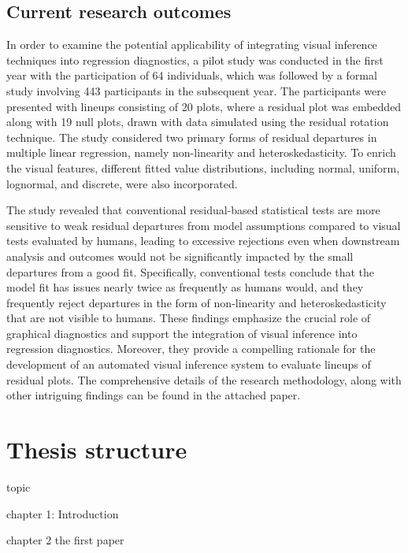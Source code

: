 \documentclass[11pt,a4paper,]{article}
\begin{document}
\hypertarget{current-research-outcomes}{%
\subsection{Current research outcomes}\label{current-research-outcomes}}

In order to examine the potential applicability of integrating visual inference techniques into regression diagnostics, a pilot study was conducted in the first year with the participation of 64 individuals, which was followed by a formal study involving 443 participants in the subsequent year. The participants were presented with lineups consisting of 20 plots, where a residual plot was embedded along with 19 null plots, drawn with data simulated using the residual rotation technique. The study considered two primary forms of residual departures in multiple linear regression, namely non-linearity and heteroskedasticity. To enrich the visual features, different fitted value distributions, including normal, uniform, lognormal, and discrete, were also incorporated.

The study revealed that conventional residual-based statistical tests are more sensitive to weak residual departures from model assumptions compared to visual tests evaluated by humans, leading to excessive rejections even when downstream analysis and outcomes would not be significantly impacted by the small departures from a good fit. Specifically, conventional tests conclude that the model fit has issues nearly twice as frequently as humans would, and they frequently reject departures in the form of non-linearity and heteroskedasticity that are not visible to humans. These findings emphasize the crucial role of graphical diagnostics and support the integration of visual inference into regression diagnostics. Moreover, they provide a compelling rationale for the development of an automated visual inference system to evaluate lineups of residual plots. The comprehensive details of the research methodology, along with other intriguing findings can be found in the attached paper.

\hypertarget{thesis-structure}{%
\section{Thesis structure}\label{thesis-structure}}

topic

chapter 1: Introduction

chapter 2
the first paper
\end{document}
